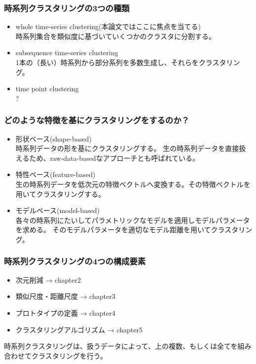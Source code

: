 \documentclass[dvipdfmx,11pt,notheorems]{beamer}
\theoremstyle{definition}
\begin{document}
\begin{frame}\frametitle{時系列クラスタリングの3つの種類}
\begin{itemize}
\item whole time-series clustering(本論文ではここに焦点を当てる)\\
時系列集合を類似度に基づいていくつかのクラスタに分割する。
\item subsequence time-series clustering\\
1本の（長い）時系列から部分系列を多数生成し、それらをクラスタリング。
\item time point clustering\\
?
\end{itemize}
\end{frame}


\begin{frame}\frametitle{どのような特徴を基にクラスタリングをするのか？}
\begin{itemize}
\item 形状ベース(shape-based)\\
時系列データの形を基にクラスタリングする。
生の時系列データを直接扱えるため、raw-data-basedなアプローチとも呼ばれている。
\item 特性ベース(feature-based)\\
生の時系列データを低次元の特徴ベクトルへ変換する。その特徴ベクトルを用いてクラスタリングする。
\item モデルベース(model-based)\\
各々の時系列にたいしてパラメトリックなモデルを適用しモデルパラメータを求める。
そのモデルパラメータを適切なモデル距離を用いてクラスタリング。

\end{itemize}
\end{frame}



\begin{frame}\frametitle{時系列クラスタリングの4つの構成要素}
\begin{itemize}
\item 次元削減 → chapter2
\item 類似尺度・距離尺度 → chapter3
\item プロトタイプの定義 → chapter4
\item クラスタリングアルゴリズム → chapter5
\end{itemize}
時系列クラスタリングは、扱うデータによって、上の複数、もしくは全てを組み合わせてクラスタリングを行う。
\end{frame}
\end{document}
